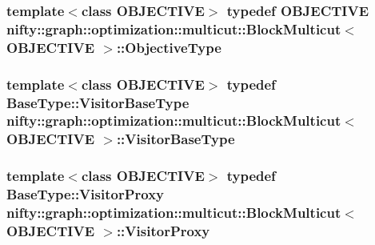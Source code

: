 \subsubsection[{Objective\+Type}]{\setlength{\rightskip}{0pt plus 5cm}template$<$class O\+B\+J\+E\+C\+T\+I\+V\+E$>$ typedef O\+B\+J\+E\+C\+T\+I\+V\+E {\bf nifty\+::graph\+::optimization\+::multicut\+::\+Block\+Multicut}$<$ O\+B\+J\+E\+C\+T\+I\+V\+E $>$\+::{\bf Objective\+Type}}\label{classnifty_1_1graph_1_1optimization_1_1multicut_1_1BlockMulticut_abaa8f874df71e8fc875ddc3928768f92}
\hypertarget{classnifty_1_1graph_1_1optimization_1_1multicut_1_1BlockMulticut_a5565253c12963ec0e384ccbaa56f1e5b}{}
\subsubsection[{Visitor\+Base\+Type}]{\setlength{\rightskip}{0pt plus 5cm}template$<$class O\+B\+J\+E\+C\+T\+I\+V\+E$>$ typedef {\bf Base\+Type\+::\+Visitor\+Base\+Type} {\bf nifty\+::graph\+::optimization\+::multicut\+::\+Block\+Multicut}$<$ O\+B\+J\+E\+C\+T\+I\+V\+E $>$\+::{\bf Visitor\+Base\+Type}}\label{classnifty_1_1graph_1_1optimization_1_1multicut_1_1BlockMulticut_a5565253c12963ec0e384ccbaa56f1e5b}
\hypertarget{classnifty_1_1graph_1_1optimization_1_1multicut_1_1BlockMulticut_ae5c617c56143fe71df413d906d027df3}{}
\subsubsection[{Visitor\+Proxy}]{\setlength{\rightskip}{0pt plus 5cm}template$<$class O\+B\+J\+E\+C\+T\+I\+V\+E$>$ typedef Base\+Type\+::\+Visitor\+Proxy {\bf nifty\+::graph\+::optimization\+::multicut\+::\+Block\+Multicut}$<$ O\+B\+J\+E\+C\+T\+I\+V\+E $>$\+::{\bf Visitor\+Proxy}}\label{classnifty_1_1graph_1_1optimization_1_1multicut_1_1BlockMulticut_ae5c617c56143fe71df413d906d027df3}
\hypertarget{classnifty_1_1graph_1_1optimization_1_1multicut_1_1BlockMulticut_aede83b2ab0b90027a3bc8534f1e3df9f}{}
